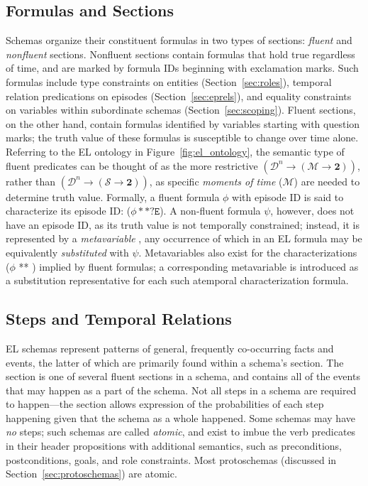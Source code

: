 \subsection{Formulas and Sections}
Schemas organize their constituent formulas in two types of sections: \textit{fluent} and \textit{nonfluent} sections.
Nonfluent sections contain formulas that hold true regardless of time, and are marked by formula IDs beginning with exclamation marks.
Such formulas include type constraints on entities (Section~\ref{sec:roles}), temporal relation predications on episodes (Section~\ref{sec:eprels}), and equality constraints on variables within subordinate schemas (Section~\ref{sec:scoping}).
Fluent sections, on the other hand, contain formulas identified by variables starting with question marks; the truth value of these formulas is susceptible to change over time alone.
Referring to the EL ontology in Figure~\ref{fig:el_ontology}, the semantic type of fluent predicates can be thought of as the more restrictive $(\mathcal{D}^{n} \rightarrow (\mathcal{M} \rightarrow \textbf{2}))$, rather than $(\mathcal{D}^{n} \rightarrow (\mathcal{S} \rightarrow \textbf{2}))$, as specific \textit{moments of time} ($\mathcal{M}$) are needed to determine truth value.
Formally, a fluent formula $\phi$ with episode ID  is said to characterize its episode ID: ($\phi ** \texttt{?E}$).
A non-fluent formula $\psi$, however, does not have an episode ID, as its truth value is not temporally constrained; instead, it is represented by a \textit{metavariable} , any occurrence of which in an EL formula may be equivalently \textit{substituted} with $\psi$.
Metavariables also exist for the characterizations ($\phi$ ** ) implied by fluent formulas; a corresponding metavariable  is introduced as a substitution representative for each such atemporal characterization formula.

\subsection{Steps and Temporal Relations}
\label{sec:steps}
EL schemas represent patterns of general, frequently co-occurring facts and events, the latter of which are primarily found within a schema's  section.
The  section is one of several fluent sections in a schema, and contains all of the events that may happen as a part of the schema.
Not all steps in a schema are required to happen---the  section allows expression of the probabilities of each step happening given that the schema as a whole happened.
Some schemas may have \textit{no} steps; such schemas are called \textit{atomic}, and exist to imbue the verb predicates in their header propositions with additional semantics, such as preconditions, postconditions, goals, and role constraints.
Most protoschemas (discussed in Section~\ref{sec:protoschemas}) are atomic.

